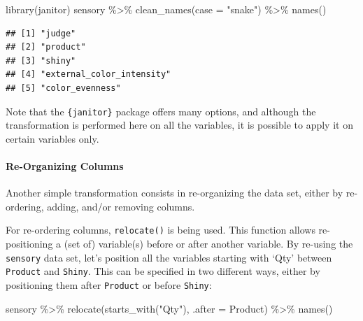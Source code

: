 \documentclass[
]{krantz}
\makeatletter
\newenvironment{Shaded}{\begin{snugshade}}{\end{snugshade}}
\newcommand{\AttributeTok}[1]{\textcolor[rgb]{0.61,0.61,0.61}{#1}}
\newcommand{\FunctionTok}[1]{\textcolor[rgb]{0,0,0}{#1}}
\newcommand{\NormalTok}[1]{#1}
\newcommand{\SpecialCharTok}[1]{\textcolor[rgb]{0,0,0}{#1}}
\newcommand{\StringTok}[1]{\textcolor[rgb]{0.5,0.5,0.5}{#1}}
\newenvironment{kframe}{%
\medskip{}
\setlength{\fboxsep}{.8em}
 \def\at@end@of@kframe{}%
 \ifinner\ifhmode%
  \def\at@end@of@kframe{\end{minipage}}%
  \begin{minipage}{\columnwidth}%
 \fi\fi%
 \def\FrameCommand##1{\hskip\@totalleftmargin \hskip-\fboxsep
 \colorbox{shadecolor}{##1}\hskip-\fboxsep
     \hskip-\linewidth \hskip-\@totalleftmargin \hskip\columnwidth}%
 \MakeFramed {\advance\hsize-\width
   \@totalleftmargin\z@ \linewidth\hsize
   \@setminipage}}%
 {\par\unskip\endMakeFramed%
 \at@end@of@kframe}
\renewenvironment{Shaded}{\begin{kframe}}{\end{kframe}}
\makeatother
\begin{document}
\begin{Shaded}
\begin{Highlighting}[]
\FunctionTok{library}\NormalTok{(janitor)}
\NormalTok{sensory }\SpecialCharTok{\%\textgreater{}\%}
  \FunctionTok{clean\_names}\NormalTok{(}\AttributeTok{case =} \StringTok{"snake"}\NormalTok{) }\SpecialCharTok{\%\textgreater{}\%}
  \FunctionTok{names}\NormalTok{()}
\end{Highlighting}
\end{Shaded}

\begin{verbatim}
## [1] "judge"                   
## [2] "product"                 
## [3] "shiny"                   
## [4] "external_color_intensity"
## [5] "color_evenness"
\end{verbatim}

Note that the \texttt{\{janitor\}} package offers many options, and although the transformation is performed here on all the variables, it is possible to apply it on certain variables only.

\hypertarget{re-organizing-columns}{%
\paragraph*{Re-Organizing Columns}\label{re-organizing-columns}}

Another simple transformation consists in re-organizing the data set, either by re-ordering, adding, and/or removing columns.

For re-ordering columns, \texttt{relocate()} is being used. This function allows re-positioning a (set of) variable(s) before or after another variable. By re-using the \texttt{sensory} data set, let's position all the variables starting with `Qty' between \texttt{Product} and \texttt{Shiny}. This can be specified in two different ways, either by positioning them after \texttt{Product} or before \texttt{Shiny}:

\begin{Shaded}
\begin{Highlighting}[]
\NormalTok{sensory }\SpecialCharTok{\%\textgreater{}\%}
  \FunctionTok{relocate}\NormalTok{(}\FunctionTok{starts\_with}\NormalTok{(}\StringTok{"Qty"}\NormalTok{), }\AttributeTok{.after =}\NormalTok{ Product) }\SpecialCharTok{\%\textgreater{}\%}
  \FunctionTok{names}\NormalTok{()}
\end{Highlighting}
\end{Shaded}
\end{document}
